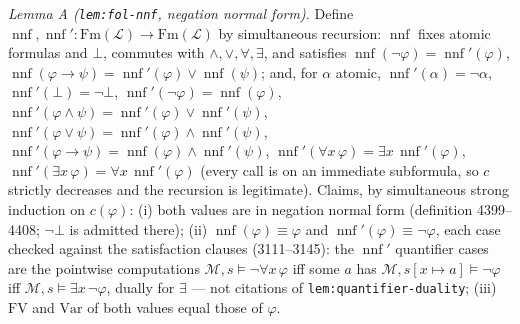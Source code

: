 \emph{Lemma A (\texttt{lem:fol-nnf}, negation normal form).}  Define
\(\operatorname{nnf},\operatorname{nnf}':\mathrm{Fm}(\mathcal{L})\to\mathrm{Fm}(\mathcal{L})\)
by simultaneous recursion: \(\operatorname{nnf}\) fixes atomic formulas and
\(\bot\), commutes with \(\wedge,\vee,\forall,\exists\), and satisfies
\(\operatorname{nnf}(\neg\varphi)=\operatorname{nnf}'(\varphi)\),
\(\operatorname{nnf}(\varphi\to\psi)=\operatorname{nnf}'(\varphi)\vee\operatorname{nnf}(\psi)\);
and, for \(\alpha\) atomic,
\(\operatorname{nnf}'(\alpha)=\neg\alpha\),
\(\operatorname{nnf}'(\bot)=\neg\bot\),
\(\operatorname{nnf}'(\neg\varphi)=\operatorname{nnf}(\varphi)\),
\(\operatorname{nnf}'(\varphi\wedge\psi)=\operatorname{nnf}'(\varphi)\vee\operatorname{nnf}'(\psi)\),
\(\operatorname{nnf}'(\varphi\vee\psi)=\operatorname{nnf}'(\varphi)\wedge\operatorname{nnf}'(\psi)\),
\(\operatorname{nnf}'(\varphi\to\psi)=\operatorname{nnf}(\varphi)\wedge\operatorname{nnf}'(\psi)\),
\(\operatorname{nnf}'(\forall x\,\varphi)=\exists x\,\operatorname{nnf}'(\varphi)\),
\(\operatorname{nnf}'(\exists x\,\varphi)=\forall x\,\operatorname{nnf}'(\varphi)\)
(every call is on an immediate subformula, so \(c\) strictly decreases and the
recursion is legitimate).  Claims, by simultaneous strong induction on
\(c(\varphi)\): (i) both values are in negation normal form (definition
4399--4408; \(\neg\bot\) is admitted there); (ii)
\(\operatorname{nnf}(\varphi)\equiv\varphi\) and
\(\operatorname{nnf}'(\varphi)\equiv\neg\varphi\), each case checked against
the satisfaction clauses (3111--3145): the \(\operatorname{nnf}'\) quantifier
cases are the pointwise computations
\(\mathcal{M},s\models\neg\forall x\,\varphi\) iff some \(a\) has
\(\mathcal{M},s[x\mapsto a]\models\neg\varphi\) iff
\(\mathcal{M},s\models\exists x\,\neg\varphi\), dually for \(\exists\) ---
not citations of \texttt{lem:quantifier-duality}; (iii) \(\mathrm{FV}\) and
\(\mathrm{Var}\) of both values equal those of \(\varphi\).

